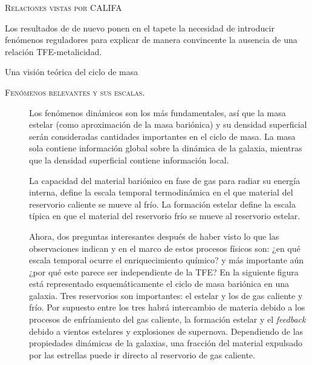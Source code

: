 \documentclass[xcolor=dvipsnames,4pt,hyperref={colorlinks,citecolor=black,linkcolor=black,urlcolor=black}]{beamer}
\begin{document}
\begin{frame}[allowframebreaks]{\textsc{Relaciones vistas por CALIFA}}
\begin{description}
Los resultados de \citeauthor{Sanchez2013} de nuevo ponen en el tapete la necesidad de introducir
fenómenos reguladores para explicar de manera convincente la ausencia de una relación
TFE-metalicidad.
%
\end{description}
\end{frame}

\begin{frame}[allowframebreaks]{Una visión teórica del ciclo de masa}
%
\begin{description}
%
\item[\textsc{Fenómenos relevantes y sus escalas.}] Los fenómenos dinámicos son los más
fundamentales, así que la masa estelar (como aproximación de la masa bariónica) y su densidad
superficial serán consideradas cantidades importantes en el ciclo de masa. La masa sola contiene
información global sobre la dinámica de la galaxia, mientras que la densidad superficial contiene
información local.

La capacidad del material bariónico en fase de gas para radiar su energía interna, define la escala
temporal termodinámica en el que material del reservorio caliente se mueve al frío.
La formación estelar define la escala típica en que el material del reservorio frío se mueve al
reservorio estelar.

Ahora, dos preguntas interesantes después de haber visto lo que las observaciones indican y en el
marco de estos procesos físicos son:
%
¿en qué escala temporal ocurre el enriquecimiento químico?
%
y más importante aún ¿por qué este parece ser independiente de la TFE?
%
En la siguiente figura
está representado esquemáticamente el ciclo de masa bariónica en una galaxia. Tres reservorios son
importantes: el estelar y los de gas caliente y frío. Por supuesto entre los tres habrá intercambio
de materia debido a los procesos de enfríamiento del gas caliente, la formación estelar y el
\emph{feedback} debido a vientos estelares y explosiones de supernova. Dependiendo de las
propiedades dinámicas de la galaxias, una fracción del material expulsado por las estrellas puede ir
directo al reservorio de gas caliente.


\end{description}
\end{frame}
\end{document}
